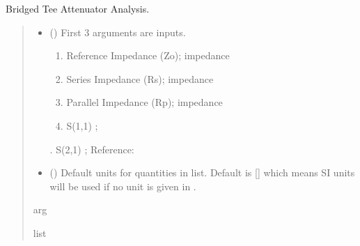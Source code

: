 \documentclass[letterpaper,10pt,english]{sphinxmanual}
\begin{document}

\begin{fulllineitems}
\label{\detokenize{components:components.Bridged_Tee_Attenuator_Analysis}}
\pysigstartsignatures
{}
\pysigstopsignatures
\sphinxAtStartPar
Bridged Tee Attenuator Analysis.
\begin{quote}\begin{description}
\begin{itemize}
\item {}
\sphinxAtStartPar
{} () \textendash{}
\sphinxAtStartPar
First 3 arguments are inputs.
\begin{enumerate}
%
\item {}
\sphinxAtStartPar
Reference Impedance (Zo); impedance

\item {}
\sphinxAtStartPar
Series Impedance (Rs); impedance

\item {}
\sphinxAtStartPar
Parallel Impedance (Rp); impedance

\item {}
\sphinxAtStartPar
S(1,1) ;

\end{enumerate}

. S(2,1) ;
Reference:


\item {}
\sphinxAtStartPar
{} (\sphinxstyleliteralemphasis{\sphinxupquote{, }}) \textendash{} Default units for quantities in  list. Default is {[}{]} which means SI units will be used if no unit is given in .

\end{itemize}

\sphinxAtStartPar
arg

\sphinxAtStartPar
list

\end{description}\end{quote}

\end{fulllineitems}
\end{document}
